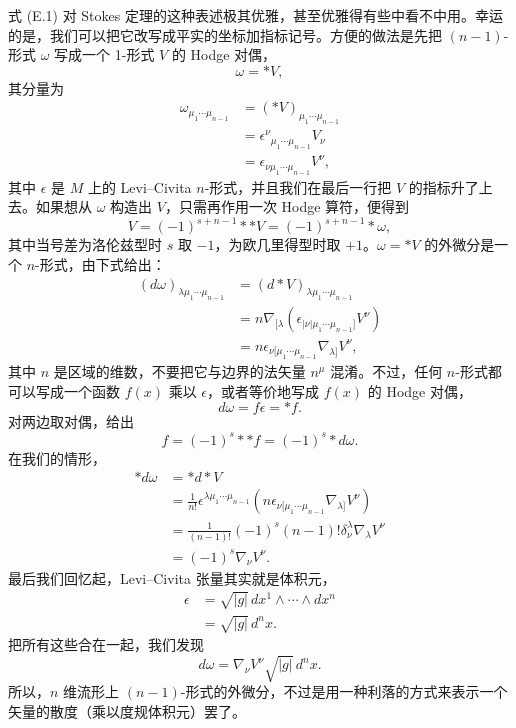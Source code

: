 式 (E.1) 对 Stokes 定理的这种表述极其优雅，甚至优雅得有些中看不中用。幸运的是，我们可以把它改写成平实的坐标加指标记号。方便的做法是先把 $(n-1)$-形式 $\omega$ 写成一个 1-形式 $V$ 的 Hodge 对偶，
\begin{equation*}
\omega = *V,
\tag{E.2}
\end{equation*}
其分量为
\begin{equation*}
\begin{aligned}
\omega_{\mu_1\cdots\mu_{n-1}} &= (*V)_{\mu_1\cdots\mu_{n-1}} \\
&= \epsilon^\nu{}_{\mu_1\cdots\mu_{n-1}} V_\nu \\
&= \epsilon_{\nu\mu_1\cdots\mu_{n-1}} V^\nu,
\end{aligned}
\tag{E.3}
\end{equation*}
其中 $\epsilon$ 是 $M$ 上的 Levi–Civita $n$-形式，并且我们在最后一行把 $V$ 的指标升了上去。如果想从 $\omega$ 构造出 $V$，只需再作用一次 Hodge 算符，便得到
\begin{equation*}
V = (-1)^{s+n-1} **V = (-1)^{s+n-1} *\omega,
\tag{E.4}
\end{equation*}
其中当号差为洛伦兹型时 $s$ 取 $-1$，为欧几里得型时取 $+1$。$\omega = *V$ 的外微分是一个 $n$-形式，由下式给出：
\begin{align*}
(d\omega)_{\lambda\mu_1\cdots\mu_{n-1}} &= (d*V)_{\lambda\mu_1\cdots\mu_{n-1}} \\
&= n\nabla_{[\lambda}\left(\epsilon_{|\nu|\mu_1\cdots\mu_{n-1}]}V^\nu\right) \\
&= n\epsilon_{\nu[\mu_1\cdots\mu_{n-1}}\nabla_{\lambda]}V^\nu,
\tag{E.5}
\end{align*}
其中 $n$ 是区域的维数，不要把它与边界的法矢量 $n^\mu$ 混淆。不过，任何 $n$-形式都可以写成一个函数 $f(x)$ 乘以 $\epsilon$，或者等价地写成 $f(x)$ 的 Hodge 对偶，
\begin{equation*}
d\omega = f\epsilon = *f.
\tag{E.6}
\end{equation*}
对两边取对偶，给出
\begin{equation*}
f = (-1)^s **f = (-1)^s *d\omega.
\tag{E.7}
\end{equation*}
在我们的情形，
\begin{align*}
*d\omega &= *d*V \\
&= \frac{1}{n!}\epsilon^{\lambda\mu_1\cdots\mu_{n-1}}\left(n\epsilon_{\nu[\mu_1\cdots\mu_{n-1}}\nabla_{\lambda]}V^\nu\right) \\
&= \frac{1}{(n-1)!}(-1)^s(n-1)!\delta^\lambda_\nu\nabla_\lambda V^\nu \\
&= (-1)^s\nabla_\nu V^\nu.
\tag{E.8}
\end{align*}
最后我们回忆起，Levi–Civita 张量其实就是体积元，
\begin{align*}
\epsilon &= \sqrt{|g|}\,dx^1\wedge\cdots\wedge dx^n \\
&= \sqrt{|g|}\,d^nx.
\tag{E.9}
\end{align*}
把所有这些合在一起，我们发现
\begin{equation*}
d\omega = \nabla_\nu V^\nu\sqrt{|g|}\,d^nx.
\tag{E.10}
\end{equation*}
所以，$n$ 维流形上 $(n-1)$-形式的外微分，不过是用一种利落的方式来表示一个矢量的散度（乘以度规体积元）罢了。

